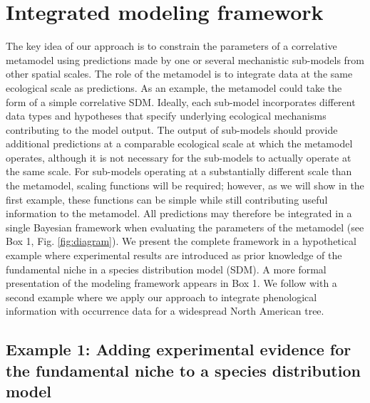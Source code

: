 \documentclass[11pt]{article}
\begin{document}
%
%

\section*{Integrated modeling framework}

The key idea of our approach is to constrain the parameters of a correlative metamodel using predictions made by one or several mechanistic sub-models from other spatial scales.
The role of the metamodel is to integrate data at the same ecological scale as predictions. 
As an example, the metamodel could take the form of a simple correlative \ac{SDM}.
Ideally, each sub-model incorporates different data types and hypotheses that specify underlying ecological mechanisms contributing to the model output.
The output of sub-models should provide additional predictions at a comparable ecological scale at which the metamodel operates, although it is not necessary for the sub-models to actually operate at the same scale.
For sub-models operating at a substantially different scale than the metamodel, scaling functions will be required; however, as we will show in the first example, these functions can be simple while still contributing useful information to the metamodel. 
All predictions may therefore be integrated in a single Bayesian framework when evaluating the parameters of the metamodel (see Box 1, Fig. \ref{fig:diagram}).
We present the complete framework in a hypothetical example where experimental results are  introduced as prior knowledge of the fundamental niche in a species distribution model (SDM).
A more formal presentation of the modeling framework appears in Box 1.
We follow with a second example where we apply our approach to integrate phenological information with occurrence data for a widespread North American tree.


%
%
\subsection*{Example 1: Adding experimental evidence for the fundamental niche to a species distribution model} 
\end{document}
